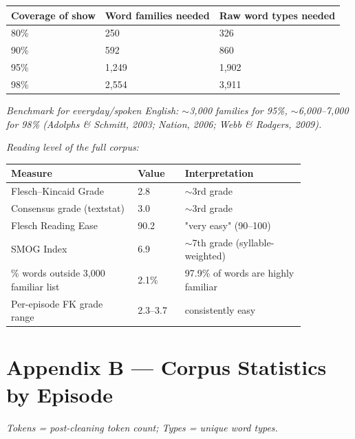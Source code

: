 \documentclass[11pt]{article}
\begin{document}
\begin{center}
\begin{tabular}{lll}
\toprule
Coverage of show & Word families needed & Raw word types needed \\
\midrule
80\% & 250 & 326 \\
90\% & 592 & 860 \\
95\% & 1,249 & 1,902 \\
98\% & 2,554 & 3,911 \\
\bottomrule
\end{tabular}
\end{center}

\emph{Benchmark for everyday/spoken English: $\sim$3,000 families for 95\%, $\sim$6,000--7,000 for 98\% (Adolphs \& Schmitt, 2003; Nation, 2006; Webb \& Rodgers, 2009).}

\emph{Reading level of the full corpus:}

\begin{center}
\begin{tabular}{p{0.431\linewidth}lp{0.419\linewidth}}
\toprule
Measure & Value & Interpretation \\
\midrule
Flesch--Kincaid Grade & 2.8 & $\sim$3rd grade \\
Consensus grade (textstat) & 3.0 & $\sim$3rd grade \\
Flesch Reading Ease & 90.2 & "very easy" (90--100) \\
SMOG Index & 6.9 & $\sim$7th grade (syllable-weighted) \\
\% words outside 3,000 familiar list & 2.1\% & 97.9\% of words are highly familiar \\
Per-episode FK grade range & 2.3--3.7 & consistently easy \\
\bottomrule
\end{tabular}
\end{center}

\FloatBarrier
\needspace{0.46\textheight}
\section*{Appendix B --- Corpus Statistics by Episode}

\emph{Tokens = post-cleaning token count; Types = unique word types.}
\end{document}

